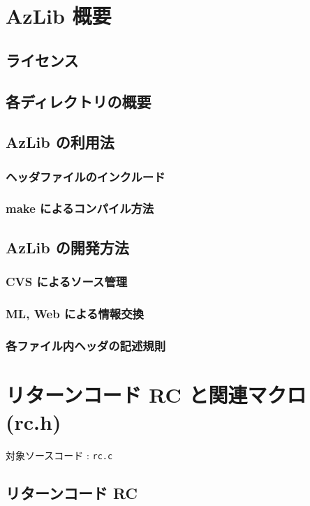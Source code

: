 \documentclass[a4paper,10pt]{jarticle}
\begin{document}
\section{AzLib 概要}

\subsection{ライセンス}

\subsection{各ディレクトリの概要}

\subsection{AzLib の利用法}
\subsubsection{ヘッダファイルのインクルード}
\subsubsection{make によるコンパイル方法}

\subsection{AzLib の開発方法}
\subsubsection{CVS によるソース管理}
\subsubsection{ML, Web による情報交換}
\subsubsection{各ファイル内ヘッダの記述規則}


\section{リターンコード RC と関連マクロ (rc.h)}
対象ソースコード : \verb|rc.c|

\subsection{リターンコード RC}
\end{document}
